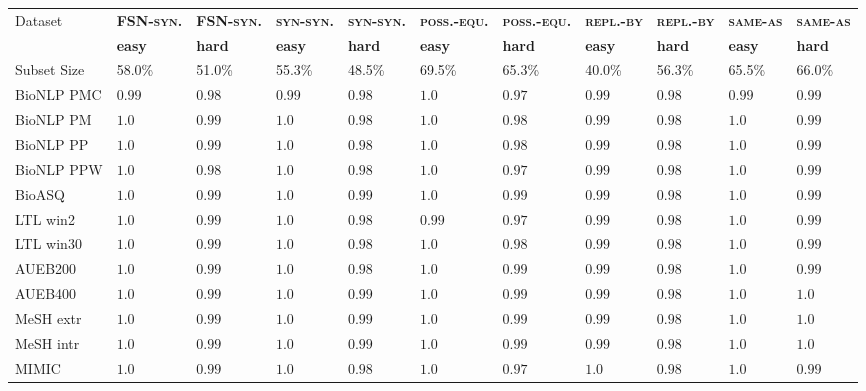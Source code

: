 \documentclass[letterpaper]{article} %
\newcommand{\dataset}[1]{\textsc{#1}}
\begin{document}
\begin{table}[h]
    \centering
\scriptsize	
     \begin{tabular}{l l l l l l l l l l l}
\multirow{2}{*}{Dataset}& \textbf{\dataset{FSN-syn.}} & \textbf{\dataset{FSN-syn.}} & \textbf{\dataset{syn-syn.}} & \textbf{\dataset{syn-syn.}} & \textbf{\dataset{poss.-equ.}} & \textbf{\dataset{poss.-equ.}} & \textbf{\dataset{repl.-by}} & \textbf{\dataset{repl.-by}} & \textbf{\dataset{same-as}} & \textbf{\dataset{same-as}} \\
& \textbf{easy} & \textbf{hard} & \textbf{easy} & \textbf{hard} & \textbf{easy} & \textbf{hard} & \textbf{easy} & \textbf{hard} & \textbf{easy} & \textbf{hard} \\ 
Subset Size & 58.0\% & 51.0\% & 55.3\% & 48.5\% & 69.5\% & 65.3\% & 40.0\% & 56.3\% & 65.5\% & 66.0\% \\
\midrule
BioNLP PMC & $0.99$ & $0.98$ & $0.99$ & $0.98$ & $1.0$ & $0.97$ & $0.99$ & $0.98$ & $0.99$ & $0.99$ \\
BioNLP PM & $1.0$ & $0.99$ & $1.0$ & $0.98$ & $1.0$ & $0.98$ & $0.99$ & $0.98$ & $1.0$ & $0.99$ \\
BioNLP PP & $1.0$ & $0.99$ & $1.0$ & $0.98$ & $1.0$ & $0.98$ & $0.99$ & $0.98$ & $1.0$ & $0.99$ \\
BioNLP PPW & $1.0$ & $0.98$ & $1.0$ & $0.98$ & $1.0$ & $0.97$ & $0.99$ & $0.98$ & $1.0$ & $0.99$ \\
BioASQ & $1.0$ & $0.99$ & $1.0$ & $0.99$ & $1.0$ & $0.99$ & $0.99$ & $0.98$ & $1.0$ & $0.99$ \\
LTL win2 & $1.0$ & $0.99$ & $1.0$ & $0.98$ & $0.99$ & $0.97$ & $0.99$ & $0.98$ & $1.0$ & $0.99$ \\
LTL win30 & $1.0$ & $0.99$ & $1.0$ & $0.98$ & $1.0$ & $0.98$ & $0.99$ & $0.98$ & $1.0$ & $0.99$ \\
AUEB200 & $1.0$ & $0.99$ & $1.0$ & $0.98$ & $1.0$ & $0.99$ & $0.99$ & $0.98$ & $1.0$ & $0.99$ \\
AUEB400 & $1.0$ & $0.99$ & $1.0$ & $0.99$ & $1.0$ & $0.99$ & $0.99$ & $0.98$ & $1.0$ & $1.0$ \\
MeSH extr & $1.0$ & $0.99$ & $1.0$ & $0.99$ & $1.0$ & $0.99$ & $0.99$ & $0.98$ & $1.0$ & $1.0$ \\
MeSH intr & $1.0$ & $0.99$ & $1.0$ & $0.99$ & $1.0$ & $0.99$ & $0.99$ & $0.98$ & $1.0$ & $1.0$ \\
MIMIC & $1.0$ & $0.99$ & $1.0$ & $0.98$ & $1.0$ & $0.97$ & $1.0$ & $0.98$ & $1.0$ & $0.99$ \\

\end{tabular}
\end{table}
\end{document}
